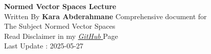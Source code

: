 \documentclass{report}
\begin{document}
\begin{titlepage}
   \begin{center}
       \vspace*{1cm}
       \textbf{Normed Vector Spaces Lecture} \\
       \vspace{0.5cm} 
       Written By \textbf{Kara Abderahmane}
       \vspace{1.5cm}
       \vfill
       Comprehensive document for \\
       The Subject Normed Vector Spaces \\
       Read Disclaimer in my 
       \href{https://github.com/Kapa9102/nvs-lecture}{\it GitHub \normalfont}  Page  \\
       \vspace{0.8cm}
       Last Update : 2025-05-27
   \end{center}
\end{titlepage}

\tableofcontents


























\end{document}

